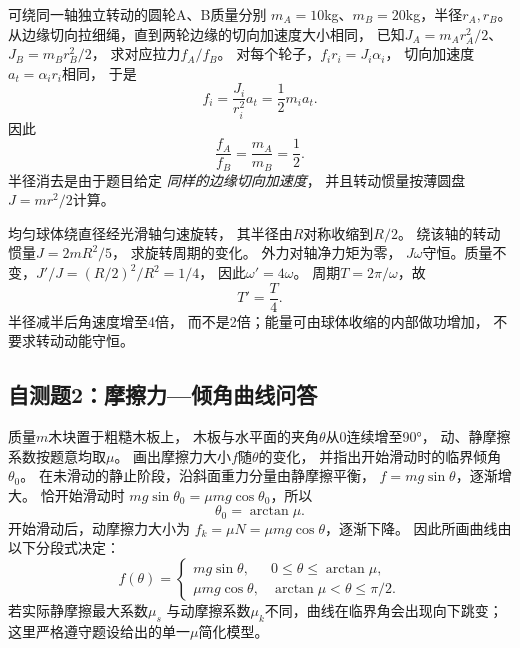 \problemtext 可绕同一轴独立转动的圆轮A、B质量分别
$m_A=10$kg、$m_B=20$kg，半径$r_A,r_B$。
从边缘切向拉细绳，直到两轮边缘的切向加速度大小相同，
已知$J_A=m_Ar_A^2/2$、$J_B=m_Br_B^2/2$，
求对应拉力$f_A/f_B$。
\workings
对每个轮子，$f_ir_i=J_i\alpha_i$，
切向加速度$a_t=\alpha_ir_i$相同，
于是
\[
f_i=\frac{J_i}{r_i^2}a_t=\frac12m_i a_t.
\]
因此
\[
\boxed{\frac{f_A}{f_B}=\frac{m_A}{m_B}=\frac12}.
\]
\crosscheck 半径消去是由于题目给定
\emph{同样的边缘切向加速度}，
并且转动惯量按薄圆盘$J=mr^2/2$计算。

\problemtext 均匀球体绕直径经光滑轴匀速旋转，
其半径由$R$对称收缩到$R/2$。
绕该轴的转动惯量$J=2mR^2/5$，
求旋转周期的变化。
\workings
外力对轴净力矩为零，
$J\omega$守恒。质量不变，$J'\!/J=(R/2)^2/R^2=1/4$，
因此$\omega'=4\omega$。
周期$T=2\pi/\omega$，故
\[
\boxed{T'=\frac T4}.
\]
\crosscheck 半径减半后角速度增至4倍，
而不是2倍；能量可由球体收缩的内部做功增加，
不要求转动动能守恒。

\subsection{自测题2：摩擦力—倾角曲线问答}

\problemtext 质量$m$木块置于粗糙木板上，
木板与水平面的夹角$\theta$从0连续增至90°，
动、静摩擦系数按题意均取$\mu$。
画出摩擦力大小$f$随$\theta$的变化，
并指出开始滑动时的临界倾角$\theta_0$。
\workings
在未滑动的静止阶段，沿斜面重力分量由静摩擦平衡，
$f=mg\sin\theta$，逐渐增大。
恰开始滑动时
$mg\sin\theta_0=\mu mg\cos\theta_0$，所以
\[
\boxed{\theta_0=\arctan\mu}.
\]
开始滑动后，动摩擦力大小为
$f_k=\mu N=\mu mg\cos\theta$，逐渐下降。
因此所画曲线由以下分段式决定：
\[
\boxed{
f(\theta)=
\begin{cases}
mg\sin\theta,&0\le\theta\le\arctan\mu,\\
\mu mg\cos\theta,&\arctan\mu<\theta\le\pi/2.
\end{cases}}
\]
\crosscheck 若实际静摩擦最大系数$\mu_s$
与动摩擦系数$\mu_k$不同，曲线在临界角会出现向下跳变；
这里严格遵守题设给出的单一$\mu$简化模型。
